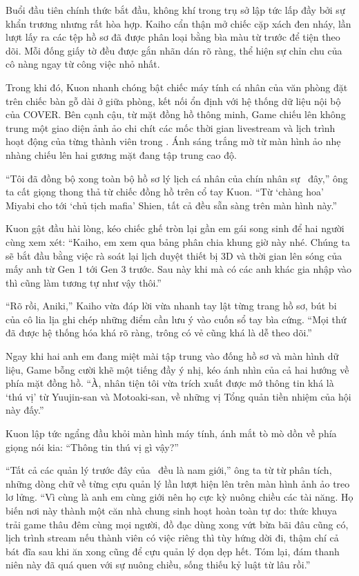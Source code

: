 \documentclass[../main.tex]{subfiles}
\begin{document}
\ct

Buổi đầu tiên chính thức bắt đầu, không khí trong trụ sở lập tức lấp đầy bởi sự khẩn trương nhưng rất hòa hợp. Kaiho cẩn thận mở chiếc cặp xách đen nháy, lần lượt lấy ra các tệp hồ sơ đã được phân loại bằng bìa màu từ trước để tiện theo dõi. Mỗi đống giấy tờ đều được gắn nhãn dán rõ ràng, thể hiện sự chỉn chu của cô nàng ngay từ công việc nhỏ nhất.

Trong khi đó, Kuon nhanh chóng bật chiếc máy tính cá nhân của văn phòng đặt trên chiếc bàn gỗ dài ở giữa phòng, kết nối ổn định với hệ thống dữ liệu nội bộ của COVER. Bên cạnh cậu, từ mặt đồng hồ thông minh, Game chiếu lên không trung một giao diện ảnh ảo chi chít các mốc thời gian livestream và lịch trình hoạt động của từng thành viên trong \hls. Ánh sáng trắng mờ từ màn hình ảo nhẹ nhàng chiếu lên hai gương mặt đang tập trung cao độ.

``Tôi đã đồng bộ xong toàn bộ hồ sơ lý lịch cá nhân của chín nhân sự \hls\ đây,'' ông ta cất giọng thong thả từ chiếc đồng hồ trên cổ tay Kuon. ``Từ `chàng hoa' Miyabi cho tới `chủ tịch mafia' Shien, tất cả đều sẵn sàng trên màn hình này.''

Kuon gật đầu hài lòng, kéo chiếc ghế tròn lại gần em gái song sinh để hai người cùng xem xét: ``Kaiho, em xem qua bảng phân chia khung giờ này nhé. Chúng ta sẽ bắt đầu bằng việc rà soát lại lịch duyệt thiết bị 3D và thời gian lên sóng của mấy anh từ Gen 1 tới Gen 3 trước. Sau này khi mà có các anh khác gia nhập vào thì cũng làm tương tự như vậy thôi.''

``Rõ rồi, Aniki,'' Kaiho vừa đáp lời vừa nhanh tay lật từng trang hồ sơ, bút bi của cô lia lịa ghi chép những điểm cần lưu ý vào cuốn sổ tay bìa cứng. ``Mọi thứ đã được hệ thống hóa khá rõ ràng, trông có vẻ cũng khá là dễ theo dõi.''

Ngay khi hai anh em đang miệt mài tập trung vào đống hồ sơ và màn hình dữ liệu, Game bỗng cười khẽ một tiếng đầy ý nhị, kéo ánh nhìn của cả hai hướng về phía mặt đồng hồ. ``À, nhân tiện tôi vừa trích xuất được mớ thông tin khá là `thú vị' từ Yuujin-san và Motoaki-san, về những vị Tổng quản tiền nhiệm của hội này đấy.''

Kuon lập tức ngẩng đầu khỏi màn hình máy tính, ánh mắt tò mò dồn về phía giọng nói kia: ``Thông tin thú vị gì vậy?''

``Tất cả các quản lý trước đây của \hls\ đều là nam giới,'' ông ta từ từ phân tích, những dòng chữ về từng cựu quản lý lần lượt hiện lên trên màn hình ảnh ảo treo lơ lửng. ``Vì cùng là anh em cùng giới nên họ cực kỳ nuông chiều các tài năng. Họ biến nơi này thành một căn nhà chung sinh hoạt hoàn toàn tự do: thức khuya trải game thâu đêm cùng mọi người, đồ đạc dùng xong vứt bừa bãi đâu cũng có, lịch trình stream nếu thành viên có việc riêng thì tùy hứng dời đi, thậm chí cả bát đĩa sau khi ăn xong cũng để cựu quản lý dọn dẹp hết. Tóm lại, đám thanh niên này đã quá quen với sự nuông chiều, sống thiếu kỷ luật từ lâu rồi.''
\end{document}
